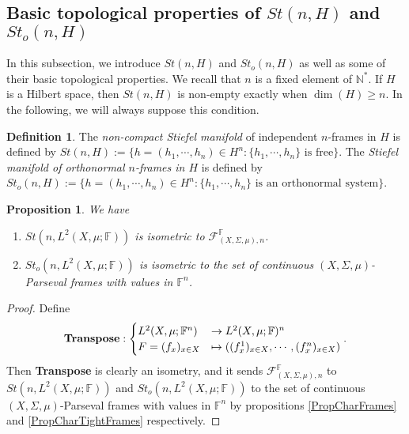 \documentclass[a4paper,12pt]{article}
\theoremstyle{plain}
\newtheorem{proposition}{Proposition}[section]
\theoremstyle{definition}
\newtheorem{definition}{Definition}[section]
\theoremstyle{remark}
\begin{document}
\subsection{Basic topological properties of \texorpdfstring{$St(n,H)$}{St(n,H)} and \texorpdfstring{$St_o(n,H)$}{Sto(n,H)}}
\label{SubSectionBasicTopPropertiesSt(n,H)}

In this subsection, we introduce $St(n,H)$ and $St_o(n,H)$ as well as some of their basic topological properties. We recall that $n$ is a fixed element of $\mathbb{N}^*$. If $H$ is a Hilbert space, then $St(n,H)$ is non-empty exactly when $\dim(H) \geq n$. In the following, we will always suppose this condition.

\begin{definition}
The \textit{non-compact Stiefel manifold} of independent $n$-frames in $H$ is defined by ${St(n,H) := \{h = (h_1,\cdots,h_n) \in H^n : \{h_1,\cdots,h_n\} \text{ is free}\}}$. The \textit{Stiefel manifold of orthonormal $n$-frames in $H$} is defined by ${St_o(n,H) := \{h = (h_1,\cdots,h_n) \in H^n : \{h_1,\cdots,h_n\} \text{ is an orthonormal system}\}}$.
\end{definition}

\begin{proposition}
\label{PropStiefelIsometricFrames}  
We have
\begin{enumerate}
\item $St(n,L^2(X,\mu;\mathbb{F}))$ is isometric to $\mathcal{F}_{(X,\Sigma,\mu),n}^\mathbb{F}$.
\item $St_o(n,L^2(X,\mu;\mathbb{F}))$ is isometric to the set of continuous $(X,\Sigma,\mu)$-Parseval frames with values in $\mathbb{F}^n$.
\end{enumerate}
\end{proposition}

\begin{proof}
Define 
\[ \textbf{\text{Transpose}} : \begin{cases} L^2(X,\mu;\mathbb{F}^n) &\to L^2(X,\mu;\mathbb{F})^n \\ F = (f_x)_{x \in X} &\mapsto ((f_x^1)_{x \in X},\cdots,(f_x^n)_{x \in X}) \end{cases}. \]
Then \textbf{Transpose} is clearly an isometry, and it sends $\mathcal{F}_{(X,\Sigma,\mu),n}^\mathbb{F}$ to $St(n,L^2(X,\mu;\mathbb{F}))$ and $St_o(n,L^2(X,\mu;\mathbb{F}))$ to the set of continuous $(X,\Sigma,\mu)$-Parseval frames with values in $\mathbb{F}^n$ by propositions \ref{PropCharFrames} and \ref{PropCharTightFrames} respectively. 
\end{proof}
\end{document}
